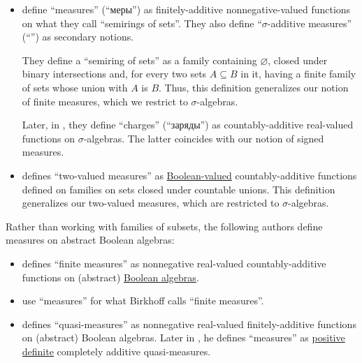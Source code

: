 \begin{remark}
\begin{itemize}
    \item \Textcite[def. 2.1]{ДьяченкоУльянов1998МераИИнтеграл} define \enquote{measures} (\enquote{меры}) as finitely-additive nonnegative-valued functions on what they call \enquote{semirings of sets}. They also define \enquote{\( \sigma \)-additive measures} (\enquote{}) as secondary notions.

    They define a \enquote{semiring of sets} as a family containing \( \varnothing \), closed under binary intersections and, for every two sets \( A \subseteq B \) in it, having a finite family of sets whose union with \( A \) is \( B \). Thus, this definition generalizes our notion of finite measures, which we restrict to \( \sigma \)-algebras.

    Later, in \cite[def. 20.1]{ДьяченкоУльянов1998МераИИнтеграл}, they define \enquote{charges} (\enquote{заряды}) as countably-additive real-valued functions on \( \sigma \)-algebras. The latter coincides with our notion of signed measures.

    \item \Textcite[217]{Engelking1989GeneralTopology} defines \enquote{two-valued measures} as \hyperref[def:boolean_function]{Boolean-valued} countably-additive functions defined on families on sets closed under countable unions. This definition generalizes our two-valued measures, which are restricted to \( \sigma \)-algebras.
  \end{itemize}

  Rather than working with families of subsets, the following authors define measures on abstract Boolean algebras:
  \begin{itemize}
    \item \Textcite[260]{Birkhoff1967LatticeTheory} defines \enquote{finite measures} as nonnegative real-valued countably-additive functions on (abstract) \hyperref[def:boolean_algebra]{Boolean algebras}.

    \item \Textcite[288]{HalmosGivant2009BooleanAlgebras} use \enquote{measures} for what Birkhoff calls \enquote{finite measures}.

    \item \Textcite[55]{Владимиров1969БулевыАлгебры} defines \enquote{quasi-measures} as nonnegative real-valued finitely-additive functions on (abstract) Boolean algebras. Later in \cite[58]{Владимиров1969БулевыАлгебры}, he defines \enquote{measures} as \hyperref[def:real_function_definiteness]{positive definite} completely additive quasi-measures.
  \end{itemize}
\end{remark}

